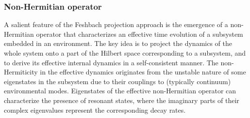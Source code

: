 \documentclass{tADP2e}
\theoremstyle{plain}
\theoremstyle{plain}
\theoremstyle{definition}
\begin{document}
\subsubsection{Non-Hermitian operator}
\label{Sec:NHO}
A salient feature of the Feshbach projection approach is the emergence of a non-Hermitian operator that characterizes an effective time evolution of a subsystem embedded in an environment. The key idea is to project the dynamics of the whole system onto a part of the Hilbert space corresponding to a subsystem, and to derive its effective internal dynamics in a self-consistent manner. The non-Hermiticity in the effective dynamics originates from the unstable nature of some eigenstates in the subsystem due to their couplings to (typically continuum) environmental modes. Eigenstates of the effective non-Hermitian operator can characterize the presence of resonant states, where the imaginary parts of their complex eigenvalues represent the corresponding decay rates. 
\end{document}
